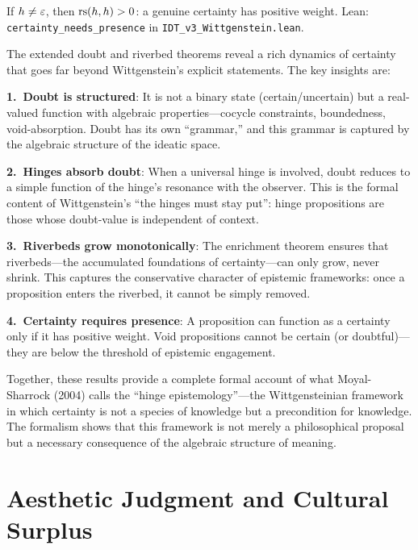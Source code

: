 \begin{theorem}
\label{thm:certainty-presence}
If $h \neq \varepsilon$, then $\mathrm{rs}(h, h) > 0$: a genuine certainty has positive
weight.
Lean: \texttt{certainty\_needs\_presence} in
\texttt{IDT\_v3\_Wittgenstein.lean}.
\end{theorem}

\begin{interpretation}
The extended doubt and riverbed theorems reveal a rich dynamics of certainty
that goes far beyond Wittgenstein's explicit statements. The key insights are:

\textbf{1.\ Doubt is structured}: It is not a binary state (certain/uncertain)
but a real-valued function with algebraic properties---cocycle constraints,
boundedness, void-absorption. Doubt has its own ``grammar,'' and this grammar
is captured by the algebraic structure of the ideatic space.

\textbf{2.\ Hinges absorb doubt}: When a universal hinge is involved, doubt
reduces to a simple function of the hinge's resonance with the observer. This
is the formal content of Wittgenstein's ``the hinges must stay put'': hinge
propositions are those whose doubt-value is independent of context.

\textbf{3.\ Riverbeds grow monotonically}: The enrichment theorem ensures that
riverbeds---the accumulated foundations of certainty---can only grow, never
shrink. This captures the conservative character of epistemic frameworks:
once a proposition enters the riverbed, it cannot be simply removed.

\textbf{4.\ Certainty requires presence}: A proposition can function as a
certainty only if it has positive weight. Void propositions cannot be
certain (or doubtful)---they are below the threshold of epistemic engagement.

Together, these results provide a complete formal account of what Moyal-Sharrock
(2004) calls the ``hinge epistemology''---the Wittgensteinian framework in which
certainty is not a species of knowledge but a precondition for knowledge. The
formalism shows that this framework is not merely a philosophical proposal but
a necessary consequence of the algebraic structure of meaning.
\end{interpretation}

\section{Aesthetic Judgment and Cultural Surplus}

